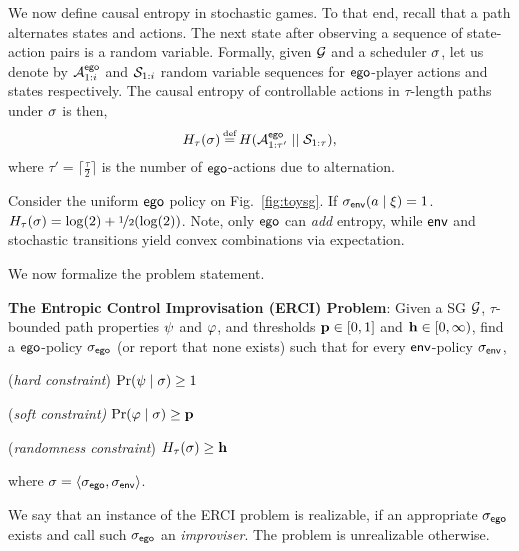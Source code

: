{{{We now define causal entropy in stochastic games.
To that end, recall that a path alternates states and actions.  The
next state after observing a sequence of state-action pairs is a
random variable. Formally, given $\mathcal{G}$ and a scheduler 
$\sigma$, let us denote by ${\mathcal{A}}^{\mathsf{ego}}_{1:i}$ and
${\mathcal{S}}_{1:i}$ random variable sequences for
$\mathsf{ego}$-player actions and states respectively. The causal entropy of
controllable actions in $\tau$-length paths under $\sigma$ is then,
\begin{equation}
  H_\tau(\sigma) \eqdef H( \rv{A}^{\pOne}_{1:\tau'} \mid\mid \rv{S}_{1:\tau} ),
\end{equation}
where $\tau' = \lceil \frac{\tau}{2}\rceil$ is the number of $\mathsf{ego}$-actions due to alternation.



\begin{example}
  Consider the uniform $\mathsf{ego}$ policy on Fig.~\ref{fig:toysg}. If $\sigma_{\mathsf{env}}(a\mid \xi) = 1$. $H_\tau(\sigma) = \log(2) + \nicefrac{1}{2}(\log(2))$. Note, only $\mathsf{ego}$ can \emph{add} entropy, while $\mathsf{env}$ and stochastic transitions yield convex combinations via expectation.
\end{example}

\noindent
We now formalize the problem statement. 
\begin{mdframed}[backgroundcolor=blue!5,nobreak=true]
\textbf{The Entropic Control Improvisation (ERCI) Problem}:
Given a SG $\mathcal{G}$, $\tau$-bounded path properties $\psi$ and $\varphi$, and thresholds $\mathbf{p} \in [0,1]$ and $\mathbf{h} \in [0,\infty)$, find a $\mathsf{ego}$-policy ${\sigma_{\mathsf{ego}}}$ (or report that none exists) such that for every $\mathsf{env}$-policy ${\sigma_{\mathsf{env}}}$,
\begin{compactenum}
	\item (\emph{hard constraint}) $\Pr(\psi \mid \sigma) \geq 1$
	\item (\emph{soft constraint)} $\Pr(\varphi \mid \sigma) \geq \mathbf{p}$
\item (\emph{randomness constraint}) $H_\tau(\sigma) \geq \mathbf{h}$
\end{compactenum}
where  $\sigma = \langle {\sigma_{\mathsf{ego}}}, {\sigma_{\mathsf{env}}} \rangle$.
\end{mdframed}
We say that an instance of the ERCI problem is realizable, if an appropriate ${\sigma_{\mathsf{ego}}}$ exists and call such ${\sigma_{\mathsf{ego}}}$ an \emph{improviser}. The problem is unrealizable otherwise.



}}}
